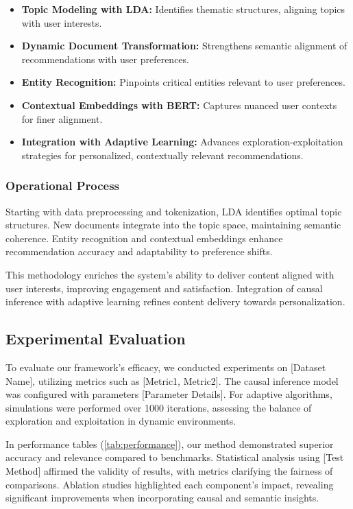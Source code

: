 \begin{itemize}
    \item \textbf{Topic Modeling with LDA:} Identifies thematic structures, aligning topics with user interests.
    \item \textbf{Dynamic Document Transformation:} Strengthens semantic alignment of recommendations with user preferences.
    \item \textbf{Entity Recognition:} Pinpoints critical entities relevant to user preferences.
    \item \textbf{Contextual Embeddings with BERT:} Captures nuanced user contexts for finer alignment.
    \item \textbf{Integration with Adaptive Learning:} Advances exploration-exploitation strategies for personalized, contextually relevant recommendations.
\end{itemize}

\subsubsection{Operational Process}

Starting with data preprocessing and tokenization, LDA identifies optimal topic structures. New documents integrate into the topic space, maintaining semantic coherence. Entity recognition and contextual embeddings enhance recommendation accuracy and adaptability to preference shifts.

This methodology enriches the system’s ability to deliver content aligned with user interests, improving engagement and satisfaction. Integration of causal inference with adaptive learning refines content delivery towards personalization.

\subsection{Experimental Evaluation}

To evaluate our framework's efficacy, we conducted experiments on [Dataset Name], utilizing metrics such as [Metric1, Metric2]. The causal inference model was configured with parameters [Parameter Details]. For adaptive algorithms, simulations were performed over 1000 iterations, assessing the balance of exploration and exploitation in dynamic environments.

In performance tables (\autoref{tab:performance}), our method demonstrated superior accuracy and relevance compared to benchmarks. Statistical analysis using [Test Method] affirmed the validity of results, with metrics clarifying the fairness of comparisons. Ablation studies highlighted each component's impact, revealing significant improvements when incorporating causal and semantic insights.


